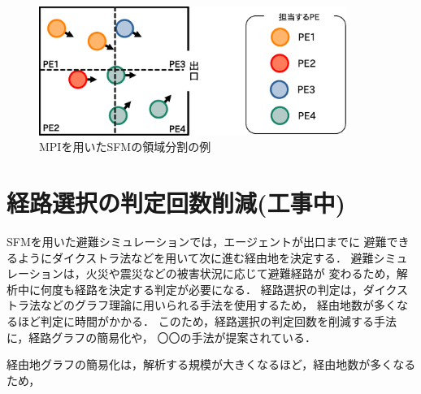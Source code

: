 \begin{figure}[t]
 \begin{center}
  \includegraphics[width=10cm,clip]{figure/ryoiki_heiretu.eps}
  \caption{MPIを用いたSFMの領域分割の例}
  \label{fig:ryouiki_heiretu}
 \end{center}
\end{figure}

\clearpage
\section{経路選択の判定回数削減(工事中)}
SFMを用いた避難シミュレーションでは，エージェントが出口までに
避難できるようにダイクストラ法などを用いて次に進む経由地を決定する．
避難シミュレーションは，火災や震災などの被害状況に応じて避難経路が
変わるため，解析中に何度も経路を決定する判定が必要になる．
経路選択の判定は，ダイクストラ法などのグラフ理論に用いられる手法を使用するため，
経由地数が多くなるほど判定に時間がかかる．
このため，経路選択の判定回数を削減する手法に，経路グラフの簡易化や，
〇〇の手法が提案されている．

経由地グラフの簡易化は，解析する規模が大きくなるほど，経由地数が多くなるため，
\fi 

